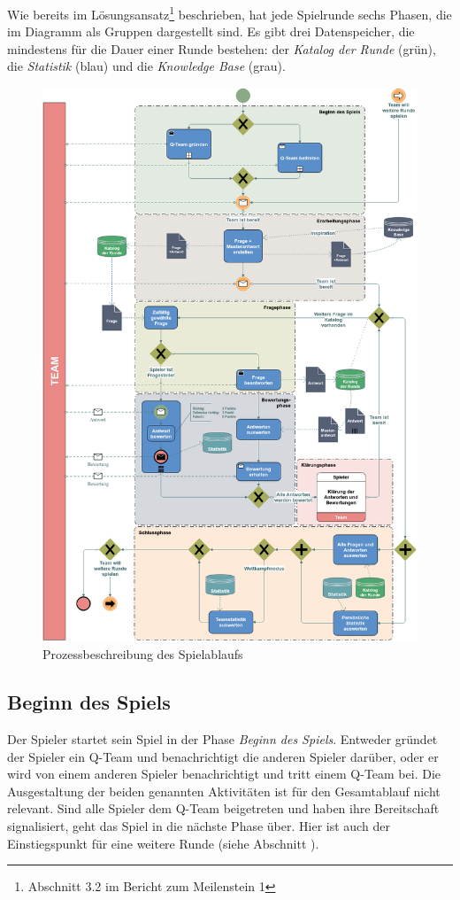\documentclass[a4paper,11pt,listof=numbered,glossary=totoc,parskip=half,toc=bib]{scrreprt}
\begin{document}
	Wie bereits im Lösungsansatz\footnote{Abschnitt 3.2 im Bericht zum Meilenstein 1} beschrieben, hat jede Spielrunde sechs Phasen, die im Diagramm als Gruppen dargestellt sind. Es gibt drei Datenspeicher, die mindestens für die Dauer einer Runde bestehen: der \textit{Katalog der Runde} (grün), die \textit{Statistik} (blau) und die \textit{Knowledge Base} (grau).
	
	\begin{figure}
		\centering
		\includegraphics[width=\textwidth]{bpmn.png}
		\caption{Prozessbeschreibung des Spielablaufs}
		\label{fig:bpmn}
	\end{figure}	 

	
	\subsection{Beginn des Spiels}
	\label{subsec:beginndesspiels}
	Der Spieler startet sein Spiel in der Phase \textit{Beginn des Spiels}. Entweder gründet der Spieler ein Q-Team und benachrichtigt die anderen Spieler darüber, oder er wird von einem anderen Spieler benachrichtigt und tritt einem Q-Team bei. 
	Die Ausgestaltung der beiden genannten Aktivitäten ist für den Gesamtablauf nicht relevant. Sind alle Spieler dem Q-Team beigetreten und haben ihre Bereitschaft signalisiert, geht das Spiel in die nächste Phase über. Hier ist auch der Einstiegspunkt für eine weitere Runde (siehe Abschnitt ).
	
\end{document}
